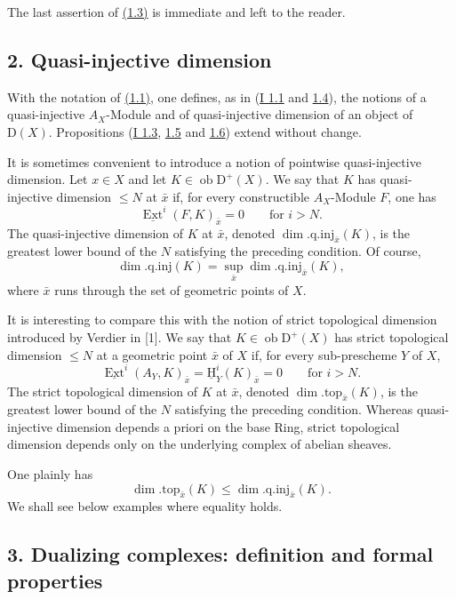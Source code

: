 \documentclass[11pt]{article}
\providecommand{\uH}{\underline{\mathrm H}}
\DeclareMathOperator{\Ext}{Ext}
\newcommand{\D}{\mathrm{D}}
\newcommand{\ob}{\operatorname{ob}}
\providecommand{\ob}{\operatorname{ob}}
\begin{document}
The last assertion of \hyperref[sga5:I:proposition:1.3:2]{(1.3)} is immediate and left to the reader.

\subsection*{2. Quasi-injective dimension}\label{sga5:I:subsection:2}

With the notation of \hyperref[sga5:I:paragraph:1.1]{(1.1)}, one defines, as in (\hyperref[sga5:I:definition:1.1]{I 1.1} and \hyperref[sga5:I:definition:1.4]{1.4}), the notions of a quasi-injective $A_X$-Module and of quasi-injective dimension of an object of $\D(X)$. Propositions (\hyperref[sga5:I:proposition:1.3]{I 1.3}, \hyperref[sga5:I:proposition:1.5]{1.5} and \hyperref[sga5:I:proposition:1.6]{1.6}) extend without change.

It is sometimes convenient to introduce a notion of pointwise quasi-injective dimension. Let $x\in X$ and let $K\in\ob\D^+(X)$. We say that $K$ has quasi-injective dimension $\leq N$ at $\bar{x}$ if, for every constructible $A_X$-Module $F$, one has
\[
        \underline{\Ext}^{i}(F,K)_{\bar{x}}=0\qquad\text{for }i>N.
\]
The quasi-injective dimension of $K$ at $\bar{x}$, denoted $\dim.\mathrm{q.inj}_{\bar{x}}(K)$, is the greatest lower bound of the $N$ satisfying the preceding condition. Of course,
\[
        \dim.\mathrm{q.inj}(K)=\sup_{\bar{x}}\dim.\mathrm{q.inj}_{\bar{x}}(K),
\]
where $\bar{x}$ runs through the set of geometric points of $X$.

It is interesting to compare this with the notion of strict topological dimension introduced by Verdier in [1]. We say that $K\in\ob\D^+(X)$ has strict topological dimension $\leq N$ at a geometric point $\bar{x}$ of $X$ if, for every sub-prescheme $Y$ of $X$,
\[
        \underline{\Ext}^{i}(A_Y,K)_{\bar{x}}=\uH^i_Y(K)_{\bar{x}}=0\qquad\text{for }i>N.
\]
The strict topological dimension of $K$ at $\bar{x}$, denoted $\dim.\mathrm{top}_{\bar{x}}(K)$, is the greatest lower bound of the $N$ satisfying the preceding condition. Whereas quasi-injective dimension depends a priori on the base Ring, strict topological dimension depends only on the underlying complex of abelian sheaves.

One plainly has
\[
        \dim.\mathrm{top}_{\bar{x}}(K)\leq \dim.\mathrm{q.inj}_{\bar{x}}(K).
\]
We shall see below examples where equality holds.

\subsection*{3. Dualizing complexes: definition and formal properties}\label{sga5:I:subsection:3}
\end{document}
